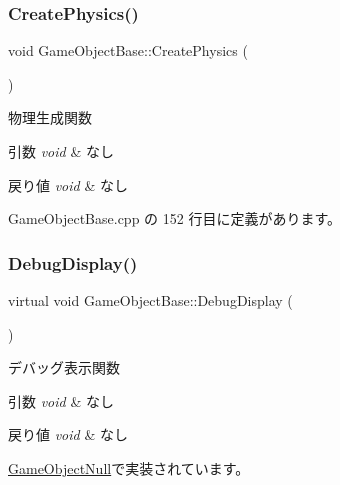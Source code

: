 \subsubsection{\texorpdfstring{Create\+Physics()}{CreatePhysics()}}
{\footnotesize\ttfamily void Game\+Object\+Base\+::\+Create\+Physics (\begin{DoxyParamCaption}{ }\end{DoxyParamCaption})}



物理生成関数 


\begin{DoxyParams}{引数}
{\em void} & なし \\
\hline
\end{DoxyParams}

\begin{DoxyRetVals}{戻り値}
{\em void} & なし \\
\hline
\end{DoxyRetVals}


 Game\+Object\+Base.\+cpp の 152 行目に定義があります。

\mbox{\label{class_game_object_base_ac5dcc38beb0ce6d66bec6bb30ad9d168}} 
\subsubsection{\texorpdfstring{Debug\+Display()}{DebugDisplay()}}
{\footnotesize\ttfamily virtual void Game\+Object\+Base\+::\+Debug\+Display (\begin{DoxyParamCaption}{ }\end{DoxyParamCaption})\hspace{0.3cm}{\ttfamily [pure virtual]}}



デバッグ表示関数 


\begin{DoxyParams}{引数}
{\em void} & なし \\
\hline
\end{DoxyParams}

\begin{DoxyRetVals}{戻り値}
{\em void} & なし \\
\hline
\end{DoxyRetVals}


\mbox{\hyperlink{class_game_object_null_a9bc551307ae5aa0ad8e754f976ffd1c7}{Game\+Object\+Null}}で実装されています。

